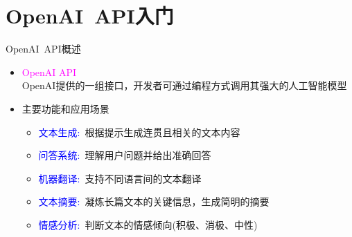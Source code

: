 \small
\section{\rm{OpenAI~API}入门}
\begin{frame}{\textrm{OpenAI~API}概述}
    \begin{itemize}
	    \item<1-> \textcolor{magenta}{\textrm{OpenAI API}}\\
		    \textrm{OpenAI}提供的一组接口，开发者可通过编程方式调用其强大的人工智能模型\\
		    {\fontsize{7.5pt}{6.2pt}}
        \item<2-> 主要功能和应用场景
        \begin{itemize}
		\setlength{\itemsep}{5pt}
		\item<2-> \textcolor{blue}{文本生成:}~根据提示生成连贯且相关的文本内容\\
			{\fontsize{7.5pt}{6.2pt}\selectfont{如故事、诗歌、文章等}}
		\item<2-> \textcolor{blue}{问答系统:}~理解用户问题并给出准确回答\\
			{\fontsize{7.5pt}{6.2pt}\selectfont{适用于智能客服等场景}}
		\item<2-> \textcolor{blue}{机器翻译:}~支持不同语言间的文本翻译
		\item<2-> \textcolor{blue}{文本摘要:}~凝炼长篇文本的关键信息，生成简明的摘要
		\item<2-> \textcolor{blue}{情感分析:}~判断文本的情感倾向(积极、消极、中性)
        \end{itemize}
    \end{itemize}
\end{frame}

